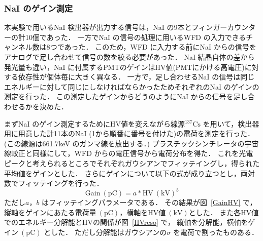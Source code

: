 \subsubsection{NaI  のゲイン測定}
本実験で用いるNaI 検出器が出力する信号は，NaI の9本とフィンガーカウンターの計10個であった．
一方でNaI の信号の処理に用いるWFD の入力できるチャンネル数は8つであった．
このため，WFD に入力する前にNaI からの信号をアナログで足し合わせて信号の数を絞る必要があった．
NaI 結晶自体の差から発光量も違い，NaI に付属するPMTのゲインはHV値(PMTにかける高電圧)に対する依存性が個体毎に大きく異なる．
一方で，足し合わせるNaI の信号は同じエネルギーに対して同じにしなければならかったためそれぞれのNaI のゲインの測定を行った．
この測定したゲインからどうのようにNaI からの信号を足し合わせるかを決めた．

まずNaI のゲイン測定するためにHV値を変えながら線源$^{137}\mathrm{Cs}$ を用いて，検出器用に用意した計11本のNaI (1から順番に番号を付けた)の電荷を測定を行った．
(この線源は661.7keV のガンマ線を放出する．\cite{IAEA_ENSDF}) 
プラスチックシンチレータの宇宙線較正と同様にして，WFD からの電圧信号から電荷分布を得た．
これを光電ピークと考えられるところでそれぞれガウシアンでフィッテイングし，得られた平均値をゲインとした．
さらにゲインについて以下の式が成り立つとし，両対数でフィッテイングを行った．\cite{Hamamatsu_PMT} 
\begin{equation}
\mathrm{Gain}~(\mathrm{pC})=a*\mathrm{HV}~(\mathrm{kV})^b \label{gain_curve}  
\end{equation}
ただし$a， b$ はフィッテイングパラメータである．
その結果が図~\ref{GainHV} で，
縦軸をゲインにあたる電荷量$~(\mathrm{pC})$，横軸をHV値$~(\mathrm{kV})$とした．
また各HV値でのエネルギー分解能とHVの関係が図~\ref{HVreso} で，
縦軸を分解能，横軸をゲイン$~(\mathrm{pC})$ とした．
ただし分解能はガウシアンの$\sigma$ を電荷で割ったものある．

